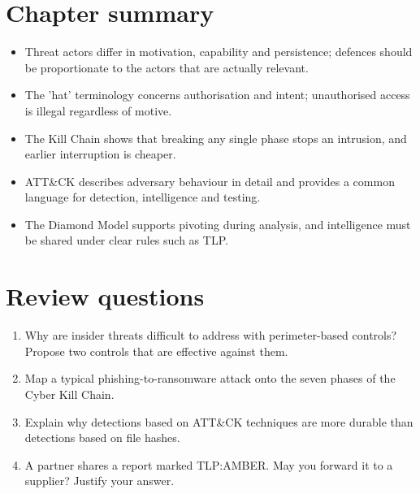 \section*{Chapter summary}
\begin{itemize}
  \item Threat actors differ in motivation, capability and persistence; defences should be proportionate to the actors that are actually relevant.
  \item The 'hat' terminology concerns authorisation and intent; unauthorised access is illegal regardless of motive.
  \item The Kill Chain shows that breaking any single phase stops an intrusion, and earlier interruption is cheaper.
  \item ATT\&CK describes adversary behaviour in detail and provides a common language for detection, intelligence and testing.
  \item The Diamond Model supports pivoting during analysis, and intelligence must be shared under clear rules such as TLP.
\end{itemize}

\section*{Review questions}
\begin{enumerate}
  \item Why are insider threats difficult to address with perimeter-based controls? Propose two controls that are effective against them.
  \item Map a typical phishing-to-ransomware attack onto the seven phases of the Cyber Kill Chain.
  \item Explain why detections based on ATT\&CK techniques are more durable than detections based on file hashes.
  \item A partner shares a report marked TLP:AMBER. May you forward it to a supplier? Justify your answer.
\end{enumerate}
